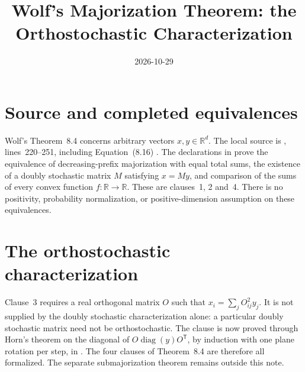 \documentclass{article}
\title{Wolf's Majorization Theorem: the Orthostochastic Characterization}
\author{}
\date{2026-10-29}
\begin{document}
\maketitle
{}

\section{Source and completed equivalences}
Wolf's Theorem~8.4 concerns arbitrary vectors $x,y\in\mathbb R^d$.
The local source is
, lines~220--251,
including Equation~(8.16) \cite{Wolf2012Quantum}.
The declarations in  prove the
equivalence of decreasing-prefix majorization with equal total sums,
the existence of a doubly stochastic matrix $M$ satisfying $x=My$,
and comparison of the sums of every convex function
$f:\mathbb R\to\mathbb R$. These are clauses~1, 2 and~4.
There is no positivity, probability normalization, or positive-dimension
assumption on these equivalences.

\section{The orthostochastic characterization}
Clause~3 requires a real orthogonal matrix $O$ such that
$x_i=\sum_jO_{ij}^2y_j$. It is not supplied by the doubly stochastic
characterization alone: a particular doubly stochastic matrix need not be
orthostochastic. The clause is now proved through Horn's theorem on the
diagonal of $O\operatorname{diag}(y)O^{\mathsf T}$, by induction with one plane
rotation per step, in .
The four clauses of Theorem~8.4 are therefore all formalized. The separate
submajorization theorem remains outside this note.


\end{document}
